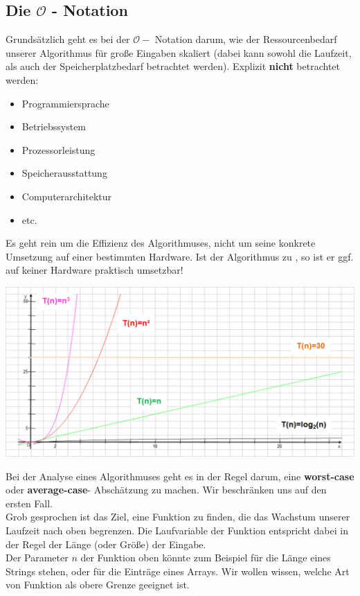 \documentclass{article}
\begin{document}
\subsection{Die $\mathcal{O}$ - Notation}
Grundsätzlich geht es bei der $\mathcal{O}-$ Notation darum, wie der Ressourcenbedarf unserer Algorithmus für große Eingaben skaliert (dabei kann sowohl die Laufzeit, als auch der Speicherplatzbedarf betrachtet werden). Explizit \textbf{nicht} betrachtet werden:
\begin{itemize}
    \item Programmiersprache
    \item Betriebssystem
    \item Prozessorleistung
    \item Speicherausstattung
    \item Computerarchitektur
    \item etc. 
\end{itemize}
Es geht rein um die Effizienz des Algorithmuses, nicht um seine konkrete Umsetzung auf einer bestimmten Hardware. Ist der Algorithmus zu , so ist er ggf. auf keiner Hardware praktisch umsetzbar!
\begin{center}
    \includegraphics[scale=0.55]{../../media/o.png}
\end{center}
Bei der Analyse eines Algorithmuses geht es in der Regel darum, eine \textbf{worst-case} oder \textbf{average-case}- Abschätzung zu machen. Wir beschränken uns auf den ersten Fall. \\
Grob gesprochen ist das Ziel, eine Funktion zu finden, die das Wachstum unserer Laufzeit nach oben begrenzen. Die Laufvariable der Funktion entspricht dabei in der Regel der Länge (oder Größe) der Eingabe. \\
Der Parameter $n$ der Funktion oben könnte zum Beispiel für die Länge eines Strings stehen, oder für die Einträge eines Arrays. Wir wollen wissen, welche Art von Funktion als obere Grenze geeignet ist. \\
\end{document}
